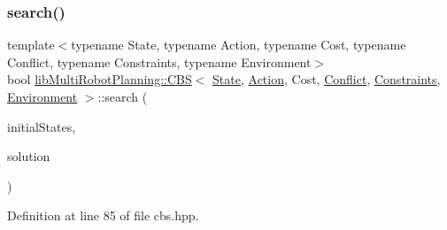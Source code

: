\subsubsection{\texorpdfstring{search()}{search()}}
{\footnotesize\ttfamily template$<$typename State, typename Action, typename Cost, typename Conflict, typename Constraints, typename Environment$>$ \\
bool \hyperlink{classlib_multi_robot_planning_1_1_c_b_s}{lib\+Multi\+Robot\+Planning\+::\+C\+BS}$<$ \hyperlink{structlib_multi_robot_planning_1_1_state}{State}, \hyperlink{namespacelib_multi_robot_planning_aba73fb71693f86a324adfa0e41e1053d}{Action}, Cost, \hyperlink{structlib_multi_robot_planning_1_1_conflict}{Conflict}, \hyperlink{structlib_multi_robot_planning_1_1_constraints}{Constraints}, \hyperlink{classlib_multi_robot_planning_1_1_environment}{Environment} $>$\+::search (\begin{DoxyParamCaption}\item[{const std\+::vector$<$ \hyperlink{structlib_multi_robot_planning_1_1_state}{State} $>$ \&}]{initial\+States,  }\item[{std\+::vector$<$ \hyperlink{structlib_multi_robot_planning_1_1_plan_result}{Plan\+Result}$<$ \hyperlink{structlib_multi_robot_planning_1_1_state}{State}, \hyperlink{namespacelib_multi_robot_planning_aba73fb71693f86a324adfa0e41e1053d}{Action}, Cost $>$ $>$ \&}]{solution }\end{DoxyParamCaption})\hspace{0.3cm}{\ttfamily [inline]}}



Definition at line 85 of file cbs.\+hpp.

